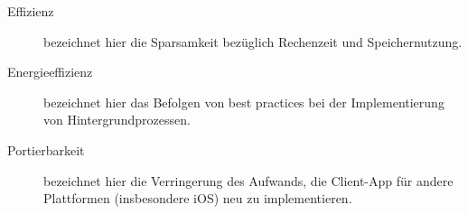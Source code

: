 \begin{center}
\begin{description}
        \item[Effizienz]
            bezeichnet hier die Sparsamkeit bezüglich Rechenzeit und Speichernutzung.

        \item[Energieeffizienz]
            bezeichnet hier das Befolgen von best practices bei der Implementierung von Hintergrundprozessen.

        \item[Portierbarkeit]
            bezeichnet hier die Verringerung des Aufwands,
            die Client-App für andere Plattformen (insbesondere iOS) neu zu implementieren.
    \end{description}
\end{center}
